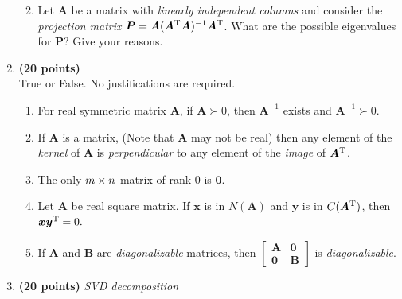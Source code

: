 \begin{enumerate}
\begin{enumerate}
\begin{figure}[H]
\end{figure}
\item
Let $\bm A$ be a matrix with \textit{linearly independent columns} and consider the \textit{projection matrix} $\bm P=\bm A(\bm A^{\mathrm T}\bm A)^{-1}\bm A^{\mathrm T}$. What are the possible eigenvalues for $\bm P$? Give your reasons.
\end{enumerate}
\newpage
\item \textbf{(20 points)} \\
True or False. No justifications are required.
\begin{enumerate}
\item
For real symmetric matrix $\bm A$, if $\bm A\succ 0$, then $\bm A^{-1}$ exists and $\bm A^{-1}\succ0.$\\
\item
If $\bm A$ is a matrix, (Note that $\bm A$ may not be real) then any element of the \textit{kernel} of $\bm A$ is \textit{perpendicular} to any element of the \textit{image} of $\bm A^{\mathrm T}$.\\
\item
The only $m\times n$ matrix of rank $0$ is $\bm 0$.\\
\item
Let $\bm A$ be real square matrix. If $\bm x$ is in $N(\bm A)$ and $\bm y$ is in $C(\bm A^{\mathrm T})$, then $\bm x\bm y^{\mathrm T}=0.$\\
\item
If $\bm A$ and $\bm B$ are \textit{diagonalizable} matrices, then $\begin{bmatrix}
\bm A&\bm 0\\\bm 0&\bm B
\end{bmatrix}$ is \textit{diagonalizable}.
\end{enumerate}
\newpage
\item \textbf{(20 points)} \textit{SVD decomposition} \\
\end{enumerate}
